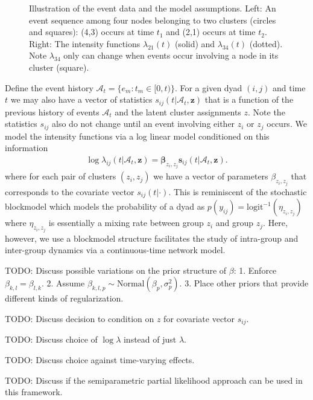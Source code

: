 \documentclass[11pt]{article}
\begin{document}
\begin{figure}
 \def\svgwidth{6in}
  
\caption{Illustration of the event data and the model assumptions.  Left: An event sequence among four nodes belonging to two clusters (circles and squares): (4,3) occurs at time $t_1$ and (2,1) occurs at time $t_2$.  Right: The intensity functions $\lambda_{21}(t)$ (solid) and $\lambda_{34}(t)$ (dotted).  Note $\lambda_{34}$ only can change when events occur involving a node in its cluster (square).}
\label{fig:example}
\end{figure}

Define the event history $\mathcal{A}_t = \{e_m: t_m \in [0,t)\}$.
For a given dyad $(i,j)$ and time $t$ we may also have a vector of statistics $s_{ij}(t|\mathcal{A}_t,\mathbf{z})$ that is a function of the previous history of events $\mathcal{A}_t$ and the latent cluster assignments $z$.  Note the statistics $s_{ij}$ also do not change until an event involving either $z_i$ or $z_j$ occurs.  We model the intensity functions via a log linear model conditioned on this information
\begin{align}
\log \lambda_{ij}(t | \mathcal{A}_t,\mathbf{z}) = \boldsymbol{\beta}_{z_i,z_j} \mathbf{s}_{ij}(t|\mathcal{A}_t,\mathbf{z}).
\end{align}
where for each pair of clusters $(z_i,z_j)$ we have a vector of parameters $\beta_{z_i,z_j}$ that corresponds to the covariate vector $s_{ij}(t|\cdot)$.  This is reminiscent of the stochastic blockmodel \cite{Nowicki2001, Kemp2006} which models the probability of a dyad as $p(y_{ij}) =\mbox{logit}^{-1}( \eta_{z_i,z_j})$ where $\eta_{z_i,z_j}$ is essentially a mixing rate between group $z_i$ and group $z_j$.  Here, however, we use a blockmodel structure facilitates the study of intra-group and inter-group dynamics via a continuous-time network model.

TODO: Discuss possible variations on the prior structure of $\beta$: 1. Enforce $\beta_{k,l} = \beta_{l,k}$. 2. Assume $\beta_{k,l,p} \sim \mbox{Normal}(\beta_p,\sigma_p^2)$. 3. Place other priors that provide different kinds of regularization. 

TODO: Discuss decision to condition on $z$ for covariate vector $s_{ij}$.

TODO: Discuss choice of $\log \lambda$ instead of just $\lambda$.

TODO: Discuss choice against time-varying effects.

TODO: Discuss if the semiparametric partial likelihood approach can be used in this framework.
\end{document}

